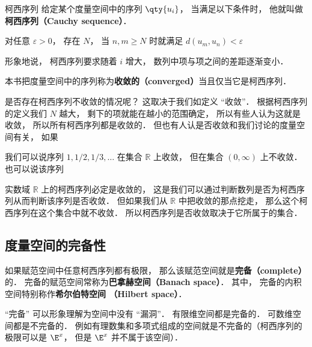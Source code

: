 

\begin{definition}{柯西序列}
给定某个度量空间中的序列 $\qty{u_i}$， 当满足以下条件时， 他就叫做\textbf{柯西序列（Cauchy sequence）}．

对任意 $\varepsilon > 0$， 存在 $N$， 当 $n, m \geqslant N$ 时就满足 $d(u_m, u_n) < \varepsilon$
\end{definition}

形象地说， 柯西序列要求随着 $i$ 增大， 数列中项与项之间的差距逐渐变小．

\begin{definition}{}
本书把度量空间中的序列称为\textbf{收敛的（converged）}当且仅当它是柯西序列．
\end{definition}


是否存在柯西序列不收敛的情况呢？ 这取决于我们如定义 “收敛”． 根据柯西序列的定义我们 $N$ 越大， 剩下的项就能在越小的范围确定， 所以有些人认为这就是收敛， 所以所有柯西序列都是收敛的． 但也有人认是否收敛和我们讨论的度量空间有关， 如果
\begin{example}{}
我们可以说序列 $1, 1/2, 1/3, \dots$ 在集合 $\mathbb R$ 上收敛， 但在集合 $(0, \infty)$ 上不收敛． 也可以说该序列
\end{example}

实数域 $\mathbb R$ 上的柯西序列必定是收敛的， 这是我们可以通过判断数列是否为柯西序列从而判断该序列是否收敛． 但如果我们从 $\mathbb R$ 中把收敛的那点挖走， 那么这个柯西序列在这个集合中就不收敛． 所以柯西序列是否收敛取决于它所属于的集合． %

\subsection{度量空间的完备性}
如果赋范空间中任意柯西序列都有极限， 那么该赋范空间就是\textbf{完备（complete）}的． 完备的赋范空间常称为\textbf{巴拿赫空间（Banach space）}． 其中， 完备的内积空间特别称作\textbf{希尔伯特空间 （Hilbert space）}．

“完备” 可以形象理解为空间中没有 “漏洞”． 有限维空间都是完备的． 可数维空间都是不完备的． 例如有理数集和多项式组成的空间就是不完备的（柯西序列的极限可以是 $\E^x$， 但是 $\E^x$ 并不属于该空间）．
